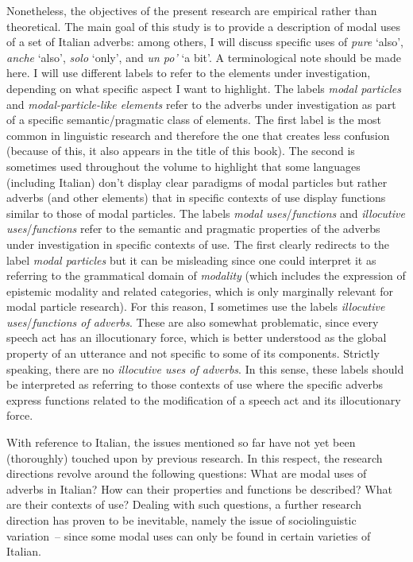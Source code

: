 Nonetheless, the objectives of the present research are empirical rather than theoretical. The main goal of this study is to provide a description of modal uses of a set of Italian adverbs: among others, I will discuss specific uses of \textit{pure} ‘also’, \textit{anche} ‘also’, \textit{solo} ‘only’, and \textit{un po’} ‘a bit’. A terminological note should be made here. I will use different labels to refer to the elements under investigation, depending on what specific aspect I want to highlight. The labels \textit{modal particles} and \textit{modal-particle-like elements} refer to the adverbs under investigation as part of a specific semantic/pragmatic class of elements. The first label is the most common in linguistic research and therefore the one that creates less confusion (because of this, it also appears in the title of this book). The second is sometimes used throughout the volume to highlight that some languages (including Italian) don’t display clear paradigms of modal particles but rather adverbs (and other elements) that in specific contexts of use display functions similar to those of modal particles. The labels \textit{modal uses}/\textit{functions} and \textit{illocutive uses}/\textit{functions} refer to the semantic and pragmatic properties of the adverbs under investigation in specific contexts of use. The first clearly redirects to the label \textit{modal particles} but it can be misleading since one could interpret it as referring to the grammatical domain of \textit{modality} (which includes the expression of epistemic modality and related categories, which is only marginally relevant for modal particle research). For this reason, I sometimes use the labels \textit{illocutive uses}/\textit{functions of adverbs}. These are also somewhat problematic, since every speech act has an illocutionary force, which is better understood as the global property of an utterance and not specific to some of its components. Strictly speaking, there are no \textit{illocutive uses of adverbs}. In this sense, these labels should be interpreted as referring to those contexts of use where the specific adverbs express functions related to the modification of a speech act and its illocutionary force.

With reference to Italian, the issues mentioned so far have not yet been (thoroughly) touched upon by previous research. In this respect, the research directions revolve around the following questions: What are modal uses of adverbs in Italian? How can their properties and functions be described? What are their contexts of use? Dealing with such questions, a further research direction has proven to be inevitable, namely the issue of sociolinguistic variation~– since some modal uses can only be found in certain varieties of Italian.

